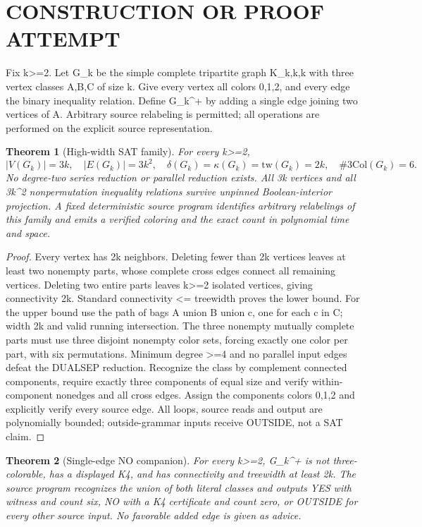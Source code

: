 \documentclass[11pt]{article}
\newtheorem{theorem}{Theorem}
\begin{document}
\section{CONSTRUCTION OR PROOF ATTEMPT}
Fix k>=2. Let G_k be the simple complete tripartite graph K_{k,k,k} with three vertex classes A,B,C of size k. Give every vertex all colors {0,1,2}, and every edge the binary inequality relation. Define G_k^+ by adding a single edge joining two vertices of A. Arbitrary source relabeling is permitted; all operations are performed on the explicit source representation.

\begin{theorem}[High-width SAT family]
For every k>=2,
\[
|V(G_k)|=3k,\quad |E(G_k)|=3k^2,\quad
\delta(G_k)=\kappa(G_k)=\mathrm{tw}(G_k)=2k,\quad
\#\mathrm{3Col}(G_k)=6.
\]
No degree-two series reduction or parallel reduction exists. All 3k vertices and all 3k^2 nonpermutation inequality relations survive unpinned Boolean-interior projection. A fixed deterministic source program identifies arbitrary relabelings of this family and emits a verified coloring and the exact count in polynomial time and space.
\end{theorem}
\begin{proof}
Every vertex has 2k neighbors. Deleting fewer than 2k vertices leaves at least two nonempty parts, whose complete cross edges connect all remaining vertices. Deleting two entire parts leaves k>=2 isolated vertices, giving connectivity 2k. Standard connectivity <= treewidth proves the lower bound. For the upper bound use the path of bags A union B union {c}, one for each c in C; width 2k and valid running intersection. The three nonempty mutually complete parts must use three disjoint nonempty color sets, forcing exactly one color per part, with six permutations. Minimum degree >=4 and no parallel input edges defeat the DUALSEP reduction. Recognize the class by complement connected components, require exactly three components of equal size and verify within-component nonedges and all cross edges. Assign the components colors 0,1,2 and explicitly verify every source edge. All loops, source reads and output are polynomially bounded; outside-grammar inputs receive OUTSIDE, not a SAT claim.
\end{proof}
\begin{theorem}[Single-edge NO companion]
For every k>=2, G_k^+ is not three-colorable, has a displayed K4, and has connectivity and treewidth at least 2k. The source program recognizes the union of both literal classes and outputs YES with witness and count six, NO with a K4 certificate and count zero, or OUTSIDE for every other source input. No favorable added edge is given as advice.
\end{theorem}
\end{document}

